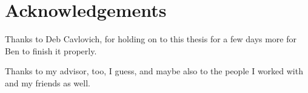 \chapter*{Acknowledgements}

Thanks to Deb Cavlovich, for holding on to this thesis for a few days more for Ben to finish it properly.

Thanks to my advisor, too, I guess, and maybe also to the people I worked with and my friends as well.
